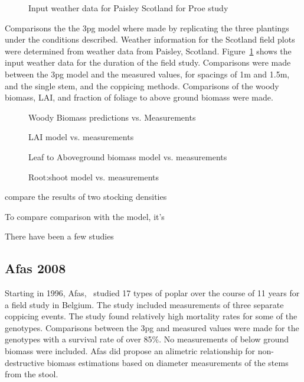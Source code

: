 \documentclass[10pt]{article}
\begin{document}
\begin{figure}
  \centering
  
  \caption{Input weather data for Paisley Scotland for Proe study}
  \label{fig:proe-weather}
\end{figure}

Comparisons the the \ac{3pg} model where made by replicating the three
plantings under the conditions described.  Weather information for the
Scotland field plots were determined from weather data from Paisley,
Scotland.  Figure~\ref{fig:proe-weather} shows the input weather data
for the duration of the field study.  Comparisons were made between
the \ac{3pg} model and the measured values, for spacings of 1m and
1.5m, and the single stem, and the coppicing methods.  Comparisons of
the woody biomass, \ac{LAI}, and fraction of foliage to above ground
biomass were made.

\begin{figure}
  \centering
  
  \caption{Woody Biomass predictions vs. Measurements}
  \label{fig:proe-wood}
\end{figure}

\begin{figure}[!ht]
  \centering
    
  \caption{\ac{LAI} model vs. measurements}
  \label{fig:proe-light}
\end{figure}

\begin{figure}[!ht]
  \centering
    
  \caption{Leaf to Aboveground biomass model vs. measurements}
  \label{fig:proe-leaf}
\end{figure}

\begin{figure}[!ht]
  \centering
    
  \caption{Root:shoot model vs. measurements}
  \label{fig:proe-rootshoot}
\end{figure}

\cite{Proe2002} compare the results of two stocking densities

To compare comparison with the
model, it's 

There have been a few studies

\subsection*{Afas 2008}
\label{afas2008}

Starting in 1996, Afas,~\cite{Afas2008a} studied 17 types of poplar
over the course of 11 years for a field study in Belgium.  The study
included measurements of three separate coppicing events.  The study
found relatively high mortality rates for some of the genotypes.
Comparisons between the \ac{3pg} and measured values were made for the
genotypes with a survival rate of over 85\%.  No measurements of below
ground biomass were included.  Afas did propose an alimetric
relationship for non-destructive biomass estimations based on diameter
measurements of the stems from the stool.
\end{document}
